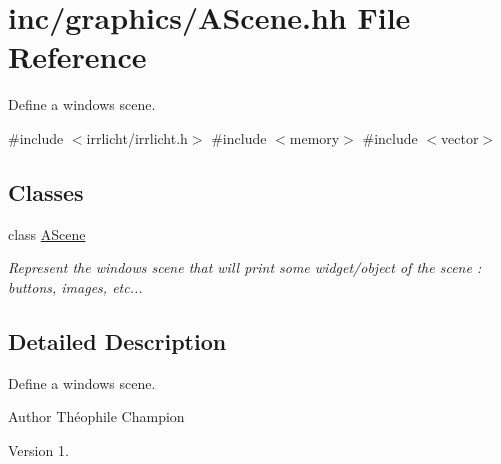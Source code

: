 \hypertarget{AScene_8hh}{}\section{inc/graphics/\+A\+Scene.hh File Reference}
\label{AScene_8hh}


Define a window\textquotesingle{}s scene.  


{\ttfamily \#include $<$irrlicht/irrlicht.\+h$>$}\newline
{\ttfamily \#include $<$memory$>$}\newline
{\ttfamily \#include $<$vector$>$}\newline
\subsection*{Classes}
\begin{DoxyCompactItemize}
\item 
class \hyperlink{classAScene}{A\+Scene}
\begin{DoxyCompactList}\small\item\em Represent the window\textquotesingle{}s scene that will print some widget/object of the scene \+: buttons, images, etc... \end{DoxyCompactList}\end{DoxyCompactItemize}


\subsection{Detailed Description}
Define a window\textquotesingle{}s scene. 

\begin{DoxyAuthor}{Author}
Théophile Champion 
\end{DoxyAuthor}
\begin{DoxyVersion}{Version}
1. 
\end{DoxyVersion}
